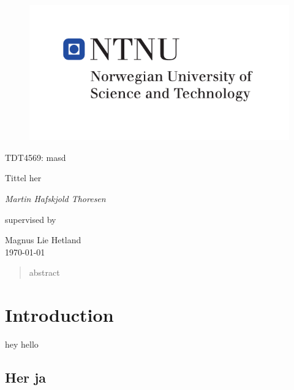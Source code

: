 \documentclass[b5paper]{report}
\begin{document}
\begin{titlepage}
  \centering
  \begin{figure}[h]
    \centering
    \includegraphics{hovedlogo_eng.pdf}
  \end{figure}
  \vspace{1.5cm}
  {\Large TDT4569: masd \par}
  \vspace{1cm}
  {\huge Tittel her\par}
  \vspace{2cm}
  {\Large\itshape{}Martin Hafskjold Thoresen\par}
  \vfill
  supervised by\par
  \large Magnus Lie Hetland\\
  \vspace{1cm}
  {\large \today\\}
\end{titlepage}



\begin{abstract}
  abstract
\end{abstract}

\tableofcontents

\chapter{Introduction}

hey hello\cite{linus}







\begin{appendices}
  \chapter{Her ja}
\end{appendices}
\end{document}
